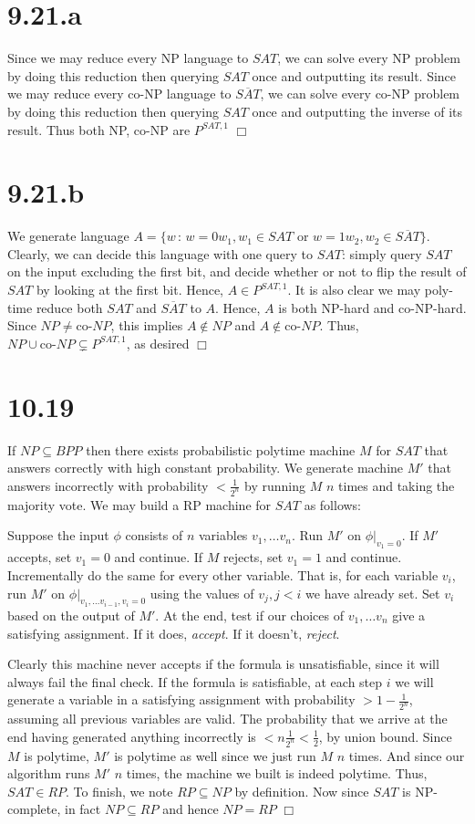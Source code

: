 \documentclass{article}
\newenvironment{myindentpar}[1]
  {\begin{list}{}
          {\setlength{\leftmargin}{#1}
          \setlength{\rightmargin}{#1}}
          \item[]
  }
  {\end{list}}
\begin{document}
\section*{9.21.a}
Since we may reduce every NP language to $SAT$, we can solve every NP problem by doing this reduction then querying $SAT$ once and outputting its result. Since we may reduce every co-NP language to $\overline{SAT}$, we can solve every co-NP problem by doing this reduction then querying $SAT$ once and outputting the inverse of its result. Thus both NP, co-NP are $P^{SAT,1}$ $\Box$

\section*{9.21.b}
We generate language $A = \{w\,:\, w = 0w_1, w_1 \in SAT \text{ or } w = 1w_2, w_2 \in \overline{SAT}\}$. Clearly, we can decide this language with one query to $SAT$: simply query $SAT$ on the input excluding the first bit, and decide whether or not to flip the result of $SAT$ by looking at the first bit. Hence, $A \in P^{SAT,1}$. It is also clear we may poly-time reduce both $SAT$ and $\overline{SAT}$ to $A$. Hence, $A$ is both NP-hard and co-NP-hard. Since $NP \neq \text{co-}NP$, this implies $A \notin NP$ and $A \notin \text{co-}NP$. Thus, $NP \cup \text{co-}NP \subsetneq P^{SAT,1}$, as desired $\Box$

\section*{10.19}
If $NP \subseteq BPP$ then there exists probabilistic polytime machine $M$ for $SAT$ that answers correctly with high constant probability. We generate machine $M'$ that answers incorrectly with probability $< \frac{1}{2^n}$ by running $M$ $n$ times and taking the majority vote. We may build a RP machine for $SAT$ as follows:
\begin{myindentpar}{1em}
Suppose the input $\phi$ consists of $n$ variables $v_1, \dots v_n$. Run $M'$ on $\phi\big\vert_{v_1 = 0}$. If $M'$ accepts, set $v_1 = 0$ and continue. If $M$ rejects, set $v_1 = 1$ and continue. Incrementally do the same for every other variable. That is, for each variable $v_i$, run $M'$ on $\phi\big\vert_{v_1, \dots v_{i-1}, v_i = 0}$ using the values of $v_j, j < i$ we have already set. Set $v_i$ based on the output of $M'$. At the end, test if our choices of $v_1,\dots v_n$ give a satisfying assignment. If it does, \textit{accept}. If it doesn't, \textit{reject}.
\end{myindentpar}
Clearly this machine never accepts if the formula is unsatisfiable, since it will always fail the final check. If the formula is satisfiable, at each step $i$ we will generate a variable in a satisfying assignment with probability $> 1 - \frac{1}{2^n}$, assuming all previous variables are valid. The probability that we arrive at the end having generated anything incorrectly is $< n \frac{1}{2^n} < \frac{1}{2}$, by union bound. Since $M$ is polytime, $M'$ is polytime as well since we just run $M$ $n$ times. And since our algorithm runs $M'$ $n$ times, the machine we built is indeed polytime. Thus, $SAT \in RP$. To finish, we note $RP \subseteq NP$ by definition. Now since $SAT$ is NP-complete, in fact $NP \subseteq RP$ and hence $NP = RP$ $\Box$
\end{document}
